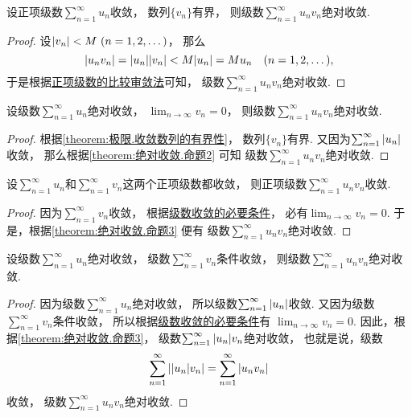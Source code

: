 \begin{proposition}\label{theorem:绝对收敛.命题2}
设正项级数\(\sum_{n=1}^\infty u_n\)收敛，
数列\(\{v_n\}\)有界，
则级数\(\sum_{n=1}^\infty u_n v_n\)绝对收敛.
\begin{proof}
设\(\abs{v_n} < M\ (n=1,2,\dotsc)\)，
那么\begin{equation*}
	\abs{u_n v_n}
	= \abs{u_n} \abs{v_n}
	< M \abs{u_n}
	= M u_n
	\quad(n=1,2,\dotsc),
\end{equation*}
于是根据\hyperref[theorem:无穷级数.正项级数的比较审敛法的推论]{正项级数的比较审敛法}可知，
级数\(\sum_{n=1}^\infty u_n v_n\)绝对收敛.
\end{proof}
\end{proposition}

\begin{proposition}\label{theorem:绝对收敛.命题3}
设级数\(\sum_{n=1}^\infty u_n\)绝对收敛，
\(\lim_{n\to\infty} v_n = 0\)，
则级数\(\sum_{n=1}^\infty u_n v_n\)绝对收敛.
\begin{proof}
根据\cref{theorem:极限.收敛数列的有界性}，
数列\(\{v_n\}\)有界.
又因为\(\sum_{n=1}^\infty \abs{u_n}\)收敛，
那么根据\cref{theorem:绝对收敛.命题2} 可知
级数\(\sum_{n=1}^\infty u_n v_n\)绝对收敛.
\end{proof}
\end{proposition}

\begin{proposition}\label{theorem:绝对收敛.命题4}
设\(\sum_{n=1}^\infty u_n\)和\(\sum_{n=1}^\infty v_n\)这两个正项级数都收敛，
则正项级数\(\sum_{n=1}^\infty u_n v_n\)收敛.
\begin{proof}
因为\(\sum_{n=1}^\infty v_n\)收敛，
根据\hyperref[theorem:无穷级数.级数收敛的必要条件]{级数收敛的必要条件}，
必有\(\lim_{n\to\infty} v_n = 0\).
于是，根据\cref{theorem:绝对收敛.命题3} 便有
级数\(\sum_{n=1}^\infty u_n v_n\)绝对收敛.
\end{proof}
\end{proposition}

\begin{proposition}\label{theorem:绝对收敛.命题5}
设级数\(\sum_{n=1}^\infty u_n\)绝对收敛，
级数\(\sum_{n=1}^\infty v_n\)条件收敛，
则级数\(\sum_{n=1}^\infty u_n v_n\)绝对收敛.
\begin{proof}
因为级数\(\sum_{n=1}^\infty u_n\)绝对收敛，
所以级数\(\sum_{n=1}^\infty \abs{u_n}\)收敛.
又因为级数\(\sum_{n=1}^\infty v_n\)条件收敛，
所以根据\hyperref[theorem:无穷级数.级数收敛的必要条件]{级数收敛的必要条件}有
\(\lim_{n\to\infty} v_n = 0\).
因此，根据\cref{theorem:绝对收敛.命题3}，
级数\(\sum_{n=1}^\infty \abs{u_n} v_n\)绝对收敛，
也就是说，级数\begin{equation*}
	\sum_{n=1}^\infty \abs{\abs{u_n} v_n}
	= \sum_{n=1}^\infty \abs{u_n v_n}
\end{equation*}收敛，
级数\(\sum_{n=1}^\infty u_n v_n\)绝对收敛.
\end{proof}
\end{proposition}

